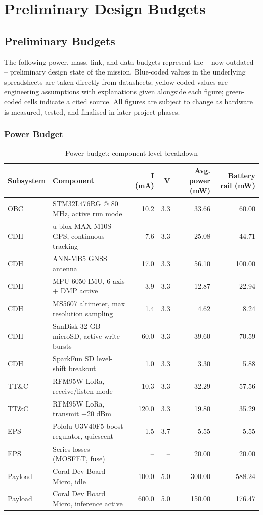 \chapter{Preliminary Design Budgets}
\label{app:prelim-budgets}

\section{Preliminary Budgets}

The following power, mass, link, and data budgets represent the -- now outdated -- preliminary design state of the mission. Blue-coded values in the underlying spreadsheets are taken directly from datasheets; yellow-coded values are engineering assumptions with explanations given alongside each figure; green-coded cells indicate a cited source. All figures are subject to change as hardware is measured, tested, and finalised in later project phases.

\subsection{Power Budget}

\begin{table}[H]
\centering
\small
\begin{tabular}{p{1.4cm}p{5cm}rrrr}
\toprule
\textbf{Subsystem} & \textbf{Component} & \textbf{I (mA)} & \textbf{V} & \textbf{Avg. power (mW)} & \textbf{Battery rail (mW)} \\
\midrule
OBC & STM32L476RG @ 80 MHz, active run mode & 10.2 & 3.3 & 33.66 & 60.00 \\
CDH & u-blox MAX-M10S GPS, continuous tracking & 7.6 & 3.3 & 25.08 & 44.71 \\
CDH & ANN-MB5 GNSS antenna & 17.0 & 3.3 & 56.10 & 100.00 \\
CDH & MPU-6050 IMU, 6-axis + DMP active & 3.9 & 3.3 & 12.87 & 22.94 \\
CDH & MS5607 altimeter, max resolution sampling & 1.4 & 3.3 & 4.62 & 8.24 \\
CDH & SanDisk 32 GB microSD, active write bursts & 60.0 & 3.3 & 39.60 & 70.59 \\
CDH & SparkFun SD level-shift breakout & 1.0 & 3.3 & 3.30 & 5.88 \\
TT\&C & RFM95W LoRa, receive/listen mode & 10.3 & 3.3 & 32.29 & 57.56 \\
TT\&C & RFM95W LoRa, transmit +20 dBm & 120.0 & 3.3 & 19.80 & 35.29 \\
EPS & Pololu U3V40F5 boost regulator, quiescent & 1.5 & 3.7 & 5.55 & 5.55 \\
EPS & Series losses (MOSFET, fuse) & -- & -- & 20.00 & 20.00 \\
Payload & Coral Dev Board Micro, idle & 100.0 & 5.0 & 300.00 & 588.24 \\
Payload & Coral Dev Board Micro, inference active & 600.0 & 5.0 & 150.00 & 176.47 \\
\bottomrule
\end{tabular}
\caption{Power budget: component-level breakdown}
\end{table}

